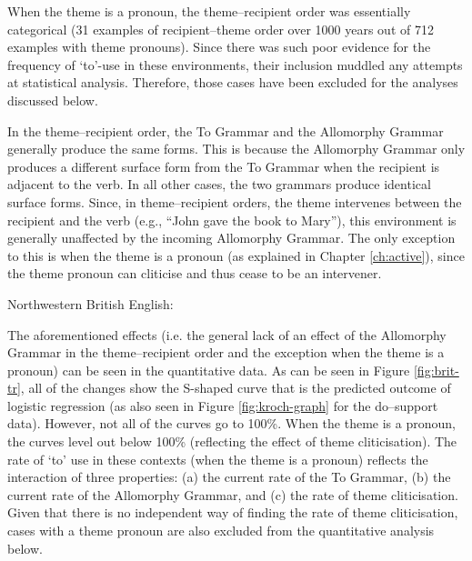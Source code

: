 	When the theme is a pronoun, the theme--recipient order was essentially categorical (31 examples of recipient--theme order over 1000 years out of 712 examples with theme pronouns). Since there was such poor evidence for the frequency of `to'-use in these environments, their inclusion muddled any attempts at statistical analysis. Therefore, those cases have been excluded for the analyses discussed below.

	In the theme--recipient order, the To Grammar and the Allomorphy Grammar generally produce the same forms. This is because the Allomorphy Grammar only produces a different surface form from the To Grammar when the recipient is adjacent to the verb. In all other cases, the two grammars produce identical surface forms. Since, in theme--recipient orders, the theme intervenes between the recipient and the verb (e.g., ``John gave the book to Mary''), this environment is generally unaffected by the incoming Allomorphy Grammar. The only exception to this is when the theme is a pronoun (as explained in Chapter \ref{ch:active}), since the theme pronoun can cliticise and thus cease to be an intervener.

	\begin{exe}
		 Northwestern British English:
		\begin{xlist}
	\end{xlist}
	\end{exe}

	The aforementioned effects (i.e. the general lack of an effect of the Allomorphy Grammar in the theme--recipient order and the exception when the theme is a pronoun) can be seen in the quantitative data. As can be seen in Figure \ref{fig:brit-tr}, all of the changes show the S-shaped curve that is the predicted outcome of logistic regression (as also seen in Figure \ref{fig:kroch-graph} for the do--support data). However, not all of the curves go to 100\%. When the theme is a pronoun, the curves level out below 100\% (reflecting the effect of theme cliticisation). The rate of `to' use in these contexts (when the theme is a pronoun) reflects the interaction of three properties: (a) the current rate of the To Grammar, (b) the current rate of the Allomorphy Grammar, and (c) the rate of theme cliticisation. Given that there is no independent way of finding the rate of theme cliticisation, cases with a theme pronoun are also excluded from the quantitative analysis below.

